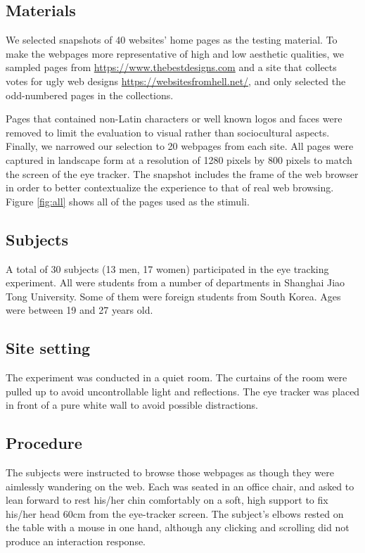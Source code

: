 \subsection{Materials}
We selected snapshots of 40 websites' home pages as the testing material. To make the webpages more representative of high and low aesthetic qualities, we sampled pages from \url{https://www.thebestdesigns.com} and a site that collects votes for ugly web designs \url{https://websitesfromhell.net/}, and only selected the odd-numbered pages in the collections.

Pages that contained non-Latin characters or well known logos and faces were removed to limit the evaluation to visual rather than sociocultural aspects. Finally, we narrowed our selection to 20 webpages from each site. All pages were captured in landscape form at a resolution of 1280 pixels by 800 pixels to match the screen of the eye tracker.
The snapshot includes the frame of the web browser in order to better contextualize the experience to that of real web browsing.
Figure \ref{fig:all} shows all of the pages used as the stimuli.

\subsection{Subjects}
A total of 30 subjects (13 men, 17 women) participated in the eye tracking experiment. All were students from a number of departments in Shanghai Jiao Tong University. Some of them were foreign students from South Korea. Ages were between 19 and 27 years old.

\subsection{Site setting}
The experiment was conducted in a quiet room. The curtains of the room were pulled up to avoid uncontrollable light and reflections.
The eye tracker was placed in front of a pure white wall to avoid possible distractions.

\subsection{Procedure}
The subjects were instructed to browse those webpages as though they were aimlessly wandering on the web. Each was seated in an office chair, and asked to lean forward to rest his/her chin comfortably on a soft, high support to fix his/her head 60cm from the eye-tracker screen. The subject's elbows rested on the table with a mouse in one hand, although any clicking and scrolling did not produce an interaction response.

